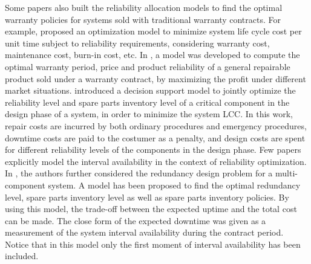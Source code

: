 \documentclass[preprint,12pt]{elsarticle}
\begin{document}
Some papers also built the reliability allocation models to find the optimal warranty policies for systems sold with traditional warranty contracts. For example, \citet{Zuo1998} proposed an optimization model to minimize system life cycle cost per unit time subject to reliability requirements, considering warranty cost, maintenance cost, burn-in cost, etc. In \citet{Huang}, a model was developed to compute the optimal warranty period, price and product reliability of a general repairable product sold under a warranty contract, by maximizing the profit under different market situations. \citet{Oner2010} introduced a decision support model to jointly optimize the reliability level and spare parts inventory level of a critical component in the design phase of a system, in order to minimize the system LCC. In this work, repair costs are incurred by both ordinary procedures and emergency procedures, downtime costs are paid to the costumer as a penalty, and design costs are spent for different reliability levels of the components in the design phase. Few papers explicitly model the interval availability in the context of reliability optimization. In \citet{Oner2013}, the authors further considered the redundancy design problem for a multi-component system. A model has been proposed to find the optimal redundancy level, spare parts inventory level as well as spare parts inventory policies. By using this model, the trade-off between the expected uptime and the total cost can be made.  The close form of the expected downtime was given as a measurement of the system interval availability during the contract period. Notice that in this model only the first moment of interval availability has been included.
\end{document}
